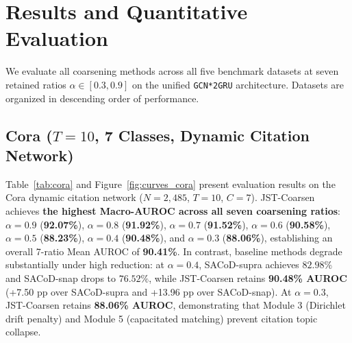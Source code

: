 \documentclass[sigconf]{acmart}
\begin{document}
\section{Results and Quantitative Evaluation}
\label{sec:results}
We evaluate all coarsening methods across all five benchmark datasets at seven retained ratios $\alpha \in [0.3, 0.9]$ on the unified \texttt{GCN*2GRU} architecture. Datasets are organized in descending order of performance.

\subsection{Cora ($T=10$, 7 Classes, Dynamic Citation Network)}
\label{sec:cora}
Table~\ref{tab:cora} and Figure~\ref{fig:curves_cora} present evaluation results on the Cora dynamic citation network ($N=2,485$, $T=10$, $C=7$). JST-Coarsen achieves \textbf{the highest Macro-AUROC across all seven coarsening ratios}: $\alpha = 0.9$ (\textbf{92.07\%}), $\alpha = 0.8$ (\textbf{91.92\%}), $\alpha = 0.7$ (\textbf{91.52\%}), $\alpha = 0.6$ (\textbf{90.58\%}), $\alpha = 0.5$ (\textbf{88.23\%}), $\alpha = 0.4$ (\textbf{90.48\%}), and $\alpha = 0.3$ (\textbf{88.06\%}), establishing an overall 7-ratio Mean AUROC of \textbf{90.41\%}. In contrast, baseline methods degrade substantially under high reduction: at $\alpha = 0.4$, SACoD-supra achieves $82.98\%$ and SACoD-snap drops to $76.52\%$, while JST-Coarsen retains \textbf{90.48\% AUROC} (+7.50 pp over SACoD-supra and +13.96 pp over SACoD-snap). At $\alpha = 0.3$, JST-Coarsen retains \textbf{88.06\% AUROC}, demonstrating that Module 3 (Dirichlet drift penalty) and Module 5 (capacitated matching) prevent citation topic collapse.
\end{document}
